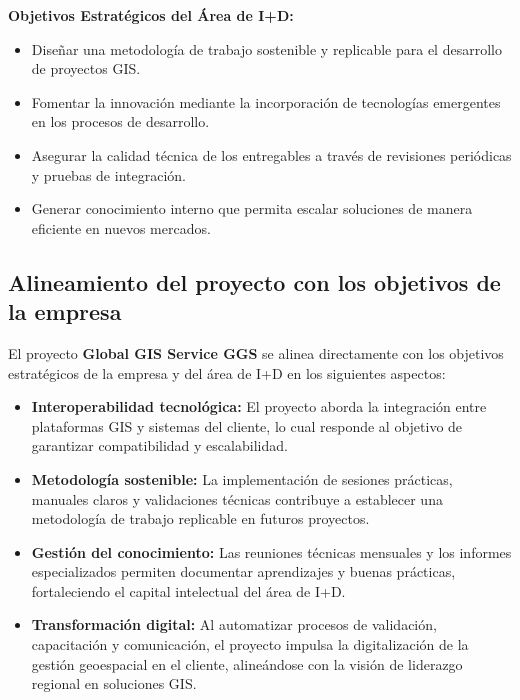 \textbf{Objetivos Estratégicos del Área de I+D:}
\begin{itemize}
    \item Diseñar una metodología de trabajo sostenible y replicable para el desarrollo de proyectos GIS.
    \item Fomentar la innovación mediante la incorporación de tecnologías emergentes en los procesos de desarrollo.
    \item Asegurar la calidad técnica de los entregables a través de revisiones periódicas y pruebas de integración.
    \item Generar conocimiento interno que permita escalar soluciones de manera eficiente en nuevos mercados.
\end{itemize}

\subsection{Alineamiento del proyecto con los objetivos de la empresa}

El proyecto \textbf{Global GIS Service GGS} se alinea directamente con los objetivos estratégicos de la empresa y del área de I+D en los siguientes aspectos:

\begin{itemize}
    \item \textbf{Interoperabilidad tecnológica:} El proyecto aborda la integración entre plataformas GIS y sistemas del cliente, lo cual responde al objetivo de garantizar compatibilidad y escalabilidad.
    \item \textbf{Metodología sostenible:} La implementación de sesiones prácticas, manuales claros y validaciones técnicas contribuye a establecer una metodología de trabajo replicable en futuros proyectos.
    \item \textbf{Gestión del conocimiento:} Las reuniones técnicas mensuales y los informes especializados permiten documentar aprendizajes y buenas prácticas, fortaleciendo el capital intelectual del área de I+D.
    \item \textbf{Transformación digital:} Al automatizar procesos de validación, capacitación y comunicación, el proyecto impulsa la digitalización de la gestión geoespacial en el cliente, alineándose con la visión de liderazgo regional en soluciones GIS.
\end{itemize}
